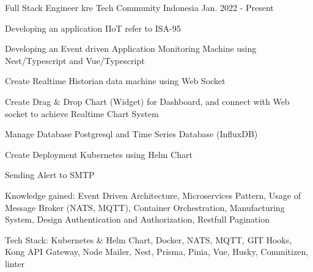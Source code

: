 

\begin{cventries}


  \cventry
    {Full Stack Engineer} %
    {kre Tech Community} %
    {Indonesia} %
    {Jan. 2022 - Present} %
    {
      \begin{cvitems} %
        \item {Developing an application IIoT refer to ISA-95}
        \item {Developing an Event driven Application Monitoring Machine using Nest/Typescript and Vue/Typescript}
        \item {Create Realtime Historian data machine using Web Socket}
        \item {Create Drag \& Drop Chart (Widget) for Dashboard, and connect with Web socket to achieve Realtime Chart System}
        \item {Manage Database Postgresql and Time Series Database (InfluxDB)}
        \item {Create Deployment Kubernetes using Helm Chart}
        \item {Sending Alert to SMTP}
        \item {Knowledge gained: Event Driven Architecture, Microservices Pattern, Usage of Message Broker (NATS, MQTT), Container Orchestration, Manufacturing System, Design Authentication and Authorization, Restfull Pagination}
        \item {Tech Stack: Kubernetes \& Helm Chart, Docker, NATS, MQTT, GIT Hooks, Kong API Gateway, Node Mailer, Nest, Prisma, Pinia, Vue, Husky, Commitizen, linter}
      \end{cvitems}
    }


\end{cventries}
